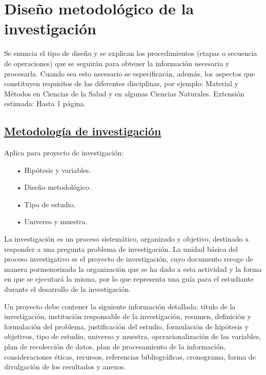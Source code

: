 \documentclass[12pt, a4paper, nofontenc, numbers=endperiod]{apa7}
\begin{document}
{\begin{figure}[h]
\begin{tablenotes}
{				} 
			\end{tablenotes}
		\end{figure}		
		
	\newpage
	
\section{\normalsize \centering Diseño metodológico de la investigación}

		
\setlength{\parindent}{1.27cm}Se enuncia el tipo de diseño y se explican los procedimientos (etapas o secuencia de operaciones) que se seguirán para obtener la información necesaria y procesarla. Cuando sea esto necesario se especificarán, además, los aspectos que constituyen requisitos de las diferentes disciplinas, por ejemplo: Material y Métodos en Ciencias de la Salud y en algunas Ciencias Naturales. Extensión estimada: Hasta 1 página.
		
\subsection*{\normalsize \underline{Metodología de investigación}}
\setlength{\parindent}{1.27cm}Aplica para proyecto de investigación:
{\doublespacing
\begin{itemize}[leftmargin=1.70cm]
		\item[•] Hipótesis y variables. 
		\item[•] Diseño metodológico.
		\item[•] Tipo de estudio.
		\item[•] Universo y muestra.
\end{itemize}
}
\setlength{\parindent}{1.27cm}La investigación es un proceso sistemático, organizado y objetivo, destinado a responder a una pregunta problema de investigación. La unidad básica del proceso investigativo es el proyecto de investigación, cuyo documento recoge de manera pormenorizada la organización que se ha dado a esta actividad y la forma en que se ejecutará la misma, por lo que representa una guía para el estudiante durante el desarrollo de la investigación.

\setlength{\parindent}{1.27cm}Un proyecto debe contener la siguiente información detallada: título de la investigación, institución responsable de la investigación, resumen, definición y formulación del problema, justificación del estudio, formulación de hipótesis y objetivos, tipo de estudio, universo y muestra, operacionalización de las variables, plan de recolección de datos, plan de procesamiento de la información, consideraciones éticas, recursos, referencias bibliográficas, cronograma, forma de divulgación de los resultados y anexos.

}
\end{document}
